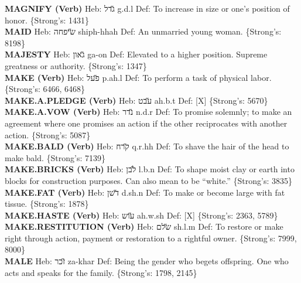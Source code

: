 {\textbf{MAGNIFY (Verb)} Heb: {\large\H גדל} g.d.l Def: To increase in size or one's position of honor. \{Strong's: 1431\}\hfill{}\\

\textbf{MAID} Heb: {\large\H שיפחה} shiph-hhah Def: An unmarried young woman. \{Strong's: 8198\}\hfill{}\\

\textbf{MAJESTY} Heb: {\large\H גאון} ga-on Def: Elevated to a higher position. Supreme greatness or authority. \{Strong's: 1347\}\hfill{}\\

\textbf{MAKE (Verb)} Heb: {\large\H פעל} p.ah.l Def: To perform a task of physical labor. \{Strong's: 6466, 6468\}\hfill{}\\

\textbf{MAKE.A.PLEDGE (Verb)} Heb: {\large\H עבט} ah.b.t Def: {[}X{]} \{Strong's: 5670\}\hfill{}\\

\textbf{MAKE.A.VOW (Verb)} Heb: {\large\H נדר} n.d.r Def: To promise solemnly; to make an agreement where one promises an action if the other reciprocates with another action. \{Strong's: 5087\}\hfill{}\\

\textbf{MAKE.BALD (Verb)} Heb: {\large\H קרח} q.r.hh Def: To shave the hair of the head to make bald. \{Strong's: 7139\}\hfill{}\\

\textbf{MAKE.BRICKS (Verb)} Heb: {\large\H לבן} l.b.n Def: To shape moist clay or earth into blocks for construction purposes. Can also mean to be ``white.'' \{Strong's: 3835\}\hfill{}\\

\textbf{MAKE.FAT (Verb)} Heb: {\large\H דשן} d.sh.n Def: To make or become large with fat tissue. \{Strong's: 1878\}\hfill{}\\

\textbf{MAKE.HASTE (Verb)} Heb: {\large\H עוש} ah.w.sh Def: {[}X{]} \{Strong's: 2363, 5789\}\hfill{}\\

\textbf{MAKE.RESTITUTION (Verb)} Heb: {\large\H שלם} sh.l.m Def: To restore or make right through action, payment or restoration to a rightful owner. \{Strong's: 7999, 8000\}\hfill{}\\

\textbf{MALE} Heb: {\large\H זכר} za-khar Def: Being the gender who begets offspring. One who acts and speaks for the family. \{Strong's: 1798, 2145\}\hfill{}\\

}
